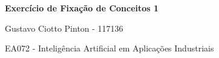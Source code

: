 \documentclass[12pt, a4paper]{article}
\author{Gustavo Ciotto Pinton}
\begin{document}
 
{\large 
    \centerline{\textbf{Exercício de Fixação de Conceitos 1}}
    \centerline{Gustavo Ciotto Pinton - 117136}
    \centerline{EA072 - Inteligência Artificial em Aplicações Industriais}
}








    
\end{document}
